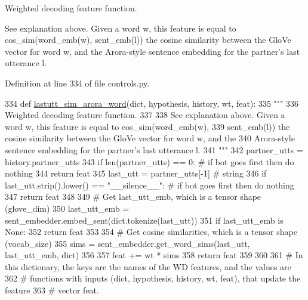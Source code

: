 \begin{DoxyVerb}Weighted decoding feature function.

See explanation above. Given a word w, this feature is equal to cos_sim(word_emb(w),
sent_emb(l)) the cosine similarity between the GloVe vector for word w, and the
Arora-style sentence embedding for the partner's last utterance l.
\end{DoxyVerb}
 

Definition at line 334 of file controls.\+py.


\begin{DoxyCode}
334 \textcolor{keyword}{def }\hyperlink{namespaceprojects_1_1controllable__dialogue_1_1controllable__seq2seq_1_1controls_afe0a10c32acfb1a7dd586ac644412589}{lastutt\_sim\_arora\_word}(dict, hypothesis, history, wt, feat):
335     \textcolor{stringliteral}{"""}
336 \textcolor{stringliteral}{    Weighted decoding feature function.}
337 \textcolor{stringliteral}{}
338 \textcolor{stringliteral}{    See explanation above. Given a word w, this feature is equal to cos\_sim(word\_emb(w),}
339 \textcolor{stringliteral}{    sent\_emb(l)) the cosine similarity between the GloVe vector for word w, and the}
340 \textcolor{stringliteral}{    Arora-style sentence embedding for the partner's last utterance l.}
341 \textcolor{stringliteral}{    """}
342     partner\_utts = history.partner\_utts
343     \textcolor{keywordflow}{if} len(partner\_utts) == 0:  \textcolor{comment}{# if bot goes first then do nothing}
344         \textcolor{keywordflow}{return} feat
345     last\_utt = partner\_utts[-1]  \textcolor{comment}{# string}
346     \textcolor{keywordflow}{if} last\_utt.strip().lower() == \textcolor{stringliteral}{"\_\_silence\_\_"}:  \textcolor{comment}{# if bot goes first then do nothing}
347         \textcolor{keywordflow}{return} feat
348 
349     \textcolor{comment}{# Get last\_utt\_emb, which is a tensor shape (glove\_dim)}
350     last\_utt\_emb = sent\_embedder.embed\_sent(dict.tokenize(last\_utt))
351     \textcolor{keywordflow}{if} last\_utt\_emb \textcolor{keywordflow}{is} \textcolor{keywordtype}{None}:
352         \textcolor{keywordflow}{return} feat
353 
354     \textcolor{comment}{# Get cosine similarities, which is a tensor shape (vocab\_size)}
355     sims = sent\_embedder.get\_word\_sims(last\_utt, last\_utt\_emb, dict)
356 
357     feat += wt * sims
358     \textcolor{keywordflow}{return} feat
359 
360 
361 \textcolor{comment}{# In this dictionary, the keys are the names of the WD features, and the values are}
362 \textcolor{comment}{# functions with inputs (dict, hypothesis, history, wt, feat), that update the feature}
363 \textcolor{comment}{# vector feat.}
\end{DoxyCode}
